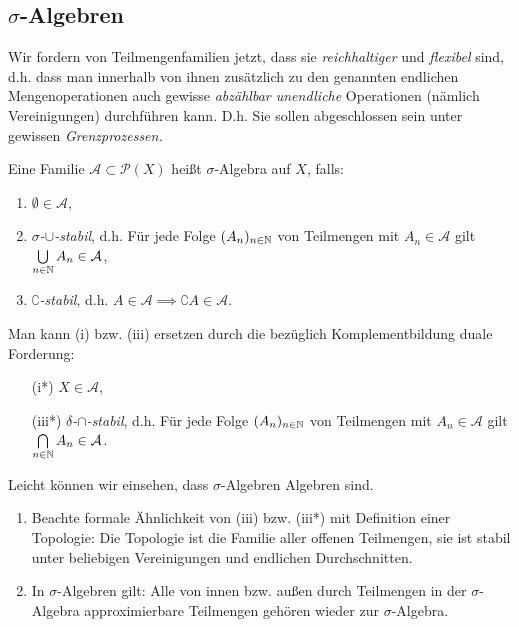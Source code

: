 \subsection{$\sigma$-Algebren}
Wir fordern von Teilmengenfamilien jetzt, dass sie \emph{reichhaltiger} und \emph{flexibel} sind, d.h. dass man innerhalb von ihnen zusätzlich zu den genannten endlichen Mengenoperationen auch gewisse \emph{abzählbar unendliche} Operationen (nämlich Vereinigungen) durchführen kann. D.h. Sie sollen abgeschlossen sein unter gewissen \emph{Grenzprozessen.}

\begin{definition}
\begin{mdframed}
Eine Familie $\mathcal{A}\subset \mathcal{P}(X)$ heißt $\sigma$-Algebra auf $X$, falls:
\begin{enumerate}[(\roman*),topsep=5pt, itemsep = 0 pt]
	\item $\emptyset \in \mathcal{A}$,
	\item \emph{$\sigma$-$\cup$-stabil}, d.h. Für jede Folge $(A_n)_{n\in \mathbb{N}}$ von Teilmengen mit $A_n \in \mathcal{A}$ gilt $\bigcup\limits_{n\in\mathbb{N}} A_n \in \mathcal{A}$,
	\item \emph{$\complement$-stabil}, d.h. $A \in \mathcal{A} \implies \complement A \in \mathcal{A}$.
\end{enumerate}
\end{mdframed}
Man kann (i) bzw. (iii) ersetzen durch die bezüglich Komplementbildung duale Forderung:
\begin{enumerate}[(\roman*),topsep=5pt, itemsep = 0 pt]
	\item[(i*)] $X \in \mathcal{A}$,
	\item[(iii*)] \emph{$\delta$-$\cap$-stabil}, d.h. Für jede Folge $(A_n)_{n\in \mathbb{N}}$ von Teilmengen mit $A_n \in \mathcal{A}$ gilt $\bigcap\limits_{n\in\mathbb{N}}A_n \in \mathcal{A}$.
\end{enumerate}
Leicht können wir einsehen, dass $\sigma$-Algebren Algebren sind.
\begin{remark}
\begin{enumerate}[(\roman*),topsep=5pt, itemsep = 0 pt]
	\item Beachte formale Ähnlichkeit von (iii) bzw. (iii*) mit Definition einer Topologie: Die Topologie ist die Familie aller offenen Teilmengen, sie ist stabil unter beliebigen Vereinigungen und endlichen Durchschnitten.
	\item In $\sigma$-Algebren gilt: Alle von innen bzw. außen durch Teilmengen in der $\sigma$-Algebra approximierbare Teilmengen gehören wieder zur $\sigma$-Algebra.
\end{enumerate}
\end{remark}
\end{definition}

